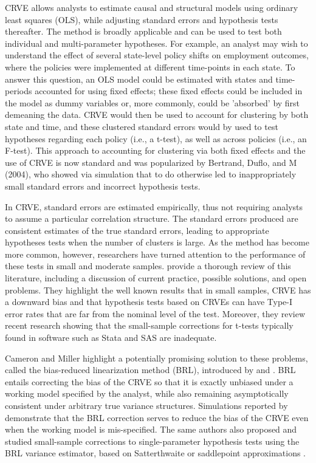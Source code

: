 \documentclass[12pt]{article}
\begin{document}
CRVE allows analysts to estimate causal and structural models using ordinary least squares (OLS), while adjusting standard errors and hypothesis tests thereafter.
The method is broadly applicable and can be used to test both individual and multi-parameter hypotheses.
For example, an analyst may wish to understand the effect of several state-level policy shifts on employment outcomes, where the policies were implemented at different time-points in each state. 
To answer this question, an OLS model could be estimated with states and time-periods accounted for using fixed effects; these fixed effects could be included in the model as dummy variables or, more commonly, could be 'absorbed' by first demeaning the data.
CRVE would then be used to account for clustering by both state and time, and these clustered standard errors would by used to test hypotheses regarding each policy (i.e., a t-test), as well as across policies (i.e., an F-test).
This approach to accounting for clustering via both fixed effects and the use of CRVE is now standard and was popularized by Bertrand, Duflo, and M (2004), who showed via simulation that to do otherwise led to inappropriately small standard errors and incorrect hypothesis tests. 

In CRVE, standard errors are estimated empirically, thus not requiring analysts to assume a particular correlation structure.
The standard errors produced are consistent estimates of the true standard errors, leading to appropriate hypotheses tests when the number of clusters is large.
As the method has become more common, however, researchers have turned attention to the performance of these tests in small and moderate samples. 
\citet{Cameron2015practitioners} provide a thorough review of this literature, including a discussion of current practice, possible solutions, and open problems. 
They highlight the well known results that in small samples, CRVE has a downward bias and that hypothesis tests based on CRVEs can have Type-I error rates that are far from the nominal level of the test.
Moreover, they review recent research showing that the small-sample corrections for t-tests typically found in software such as Stata and SAS are inadequate. 

Cameron and Miller highlight a potentially promising solution to these problems, called the bias-reduced linearization method (BRL), introduced by \citet{McCaffrey2001generalizations} and \citet{Bell2002bias}. 
BRL entails correcting the bias of the CRVE so that it is exactly unbiased under a working model specified by the analyst, while also remaining asymptotically consistent under arbitrary true variance structures. 
Simulations reported by \citet{Bell2002bias} demonstrate that the BRL correction serves to reduce the bias of the CRVE even when the working model is mis-specified. 
The same authors also proposed and studied small-sample corrections to single-parameter hypothesis tests using the BRL variance estimator, based on Satterthwaite \citep{Bell2002bias} or saddlepoint approximations \citep{McCaffrey2006improved}.
\end{document}
